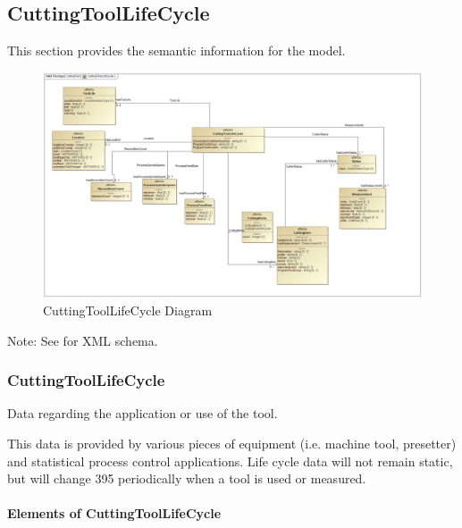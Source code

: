 \subsection{CuttingToolLifeCycle} \label{sec:CuttingToolLifeCycle}


This section provides the semantic information for the  model.

\begin{figure}[ht]
  \centering
    \includegraphics[width=1.0\textwidth]{figures/CuttingToolLifeCycle.png}
  \caption{CuttingToolLifeCycle Diagram}
  \label{fig:CuttingToolLifeCycle Diagram}
\end{figure}

\FloatBarrier


Note: See  for XML schema.



\subsubsection{CuttingToolLifeCycle}




Data regarding the application or use of the tool.

This data is provided by various pieces of equipment (i.e. machine tool, presetter) and statistical process control applications. Life cycle data will not remain static, but will change 395 periodically when a tool is used or measured.


\paragraph{Elements of CuttingToolLifeCycle}\mbox{}
\label{sec:Elements of CuttingToolLifeCycle}

